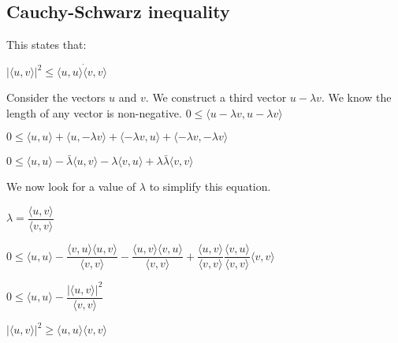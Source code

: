 
\subsection{Cauchy-Schwarz inequality}

This states that:

\(|\langle u,v\rangle |^2 \le \langle u, u\rangle \dot \langle v, v\rangle \)

Consider the vectors \(u\) and \(v\). We construct a third vector \(u-\lambda v\).
We know the length of any vector is non-negative.
\(0\le \langle u-\lambda v, u-\lambda v\rangle\)

\(0\le \langle u, u\rangle+ \langle u, -\lambda v\rangle+\langle -\lambda v, u\rangle+ \langle -\lambda v, -\lambda v\rangle\)

\(0\le \langle u, u\rangle-\bar{\lambda }\langle u, v\rangle-\lambda { \langle v, u\rangle }+ \lambda \bar{\lambda }\langle v, v\rangle\)


We now look for a value of \(\lambda \) to simplify this equation.

\(\lambda = \dfrac{\langle u,v \rangle}{\langle v, v\rangle}\)

\(0\le \langle u, u\rangle-\dfrac{\langle v,u \rangle\langle u, v\rangle}{\langle v, v\rangle}-\dfrac{\langle u,v \rangle  \langle v, u\rangle }{\langle v, v\rangle}+ \dfrac{\langle u,v \rangle}{\langle v, v\rangle}\dfrac{\langle v,u \rangle}{\langle v, v\rangle}\langle v, v\rangle\)

\(0\le \langle u, u\rangle-\dfrac{|\langle u,v \rangle|^2}{\langle v, v\rangle}\)

\(|\langle u,v \rangle|^2\ge \langle u, u\rangle\langle v, v\rangle\)

